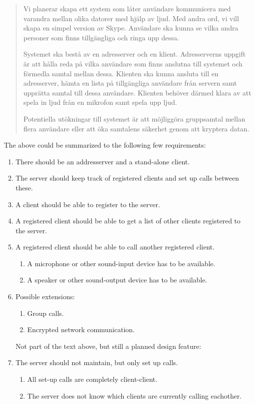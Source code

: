 \documentclass[a4paper,titlepage]{article}
\begin{document}
\begin{quotation}
Vi planerar skapa ett system som låter användare kommunicera med varandra mellan olika datorer med hjälp av ljud. Med andra ord, vi vill skapa en simpel version av Skype. Användare ska kunna se vilka andra personer som finns tillgängliga och ringa upp dessa.

Systemet ska bestå av en adresserver och en klient.
Adresserverns uppgift är att hålla reda på vilka användare som finns anslutna till systemet och förmedla samtal mellan dessa.
Klienten ska kunna ansluta till en adresserver, hämta en lista på tillgängliga användare från servern samt upprätta samtal till dessa användare. Klienten behöver därmed klara av att spela in ljud från en mikrofon samt spela upp ljud.

Potentiella utökningar till systemet är att möjliggöra gruppsamtal mellan flera användare eller att öka samtalens säkerhet genom att kryptera datan.
\end{quotation}
The above could be summarized to the following few requirements:
\begin{enumerate}
\item There should be an addresserver and a stand-alone client.
\item The server should keep track of registered clients and set up calls between these.
\item A client should be able to register to the server.
\item A registered client should be able to get a list of other clients registered to the server.
\item A registered client should be able to call another registered client.
\begin{enumerate}
\item A microphone or other sound-input device has to be available.
\item A speaker or other sound-output device has to be available.
\end{enumerate}
\item Possible extensions:
\begin{enumerate}
\item Group calls.
\item Encrypted network communication.
\end{enumerate}
\noindent Not part of the text above, but still a planned design feature:
\item The server should not maintain, but only set up calls.
\begin{enumerate}
\item All set-up calls are completely client-client.
\item The server does not know which clients are currently calling eachother.
\end{enumerate}
\end{enumerate}
\end{document}
